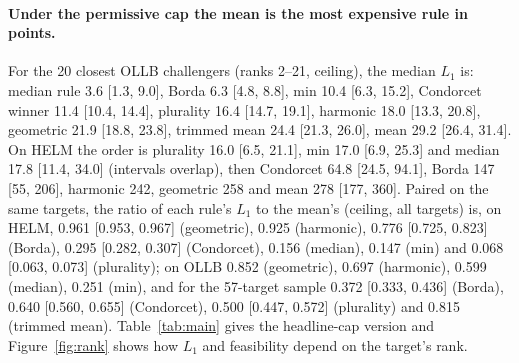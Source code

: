 \paragraph{Under the permissive cap the mean is the most expensive rule in points.}
For the 20 closest OLLB challengers (ranks 2--21, ceiling), the median $L_1$ is: median rule 3.6 [1.3, 9.0], Borda 6.3 [4.8, 8.8], min 10.4 [6.3, 15.2], Condorcet winner 11.4 [10.4, 14.4], plurality 16.4 [14.7, 19.1], harmonic 18.0 [13.3, 20.8], geometric 21.9 [18.8, 23.8], trimmed mean 24.4 [21.3, 26.0], mean 29.2 [26.4, 31.4].
On HELM the order is plurality 16.0 [6.5, 21.1], min 17.0 [6.9, 25.3] and median 17.8 [11.4, 34.0] (intervals overlap), then Condorcet 64.8 [24.5, 94.1], Borda 147 [55, 206], harmonic 242, geometric 258 and mean 278 [177, 360].
Paired on the same targets, the ratio of each rule's $L_1$ to the mean's (ceiling, all targets) is, on HELM, 0.961 [0.953, 0.967] (geometric), 0.925 (harmonic), 0.776 [0.725, 0.823] (Borda), 0.295 [0.282, 0.307] (Condorcet), 0.156 (median), 0.147 (min) and 0.068 [0.063, 0.073] (plurality); on OLLB 0.852 (geometric), 0.697 (harmonic), 0.599 (median), 0.251 (min), and for the 57-target sample 0.372 [0.333, 0.436] (Borda), 0.640 [0.560, 0.655] (Condorcet), 0.500 [0.447, 0.572] (plurality) and 0.815 (trimmed mean).
Table~\ref{tab:main} gives the headline-cap version and Figure~\ref{fig:rank} shows how $L_1$ and feasibility depend on the target's rank.

\begin{table}[t]
\caption{Minimum investment under the headline cap (\texttt{emp95}) for the 20 closest challengers (ranks 2--21) and all other targets: median tasks touched $K$ and points $L_1$ [95\% bootstrap CI] over feasible targets, and number of infeasible targets out of all (a target already first under the rule counts with $K=L_1=0$). HELM uses the cap transferred from OLLB; $^\dagger$ rules run on the 57-target OLLB sample (trimmed mean has no $K$); single numbers have fewer than five feasible targets.}
\label{tab:main}
\centering\small

\end{table}

